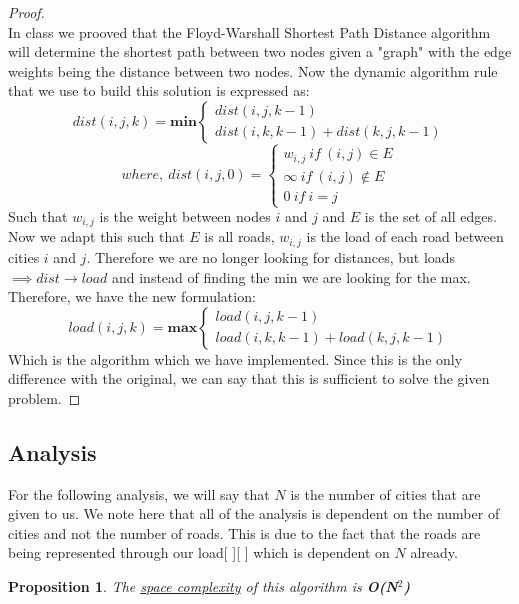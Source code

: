 \documentclass[12pt]{article}
\newtheorem{proposition}[theorem]{Proposition}
\begin{document}
\begin{proof}
~ \\ \indent In class we prooved that the Floyd-Warshall Shortest Path Distance algorithm
will determine the shortest path between two nodes given a "graph" with the edge
weights being the distance between two nodes. Now the dynamic algorithm rule that
we use to build this solution is expressed as:
\[ dist(i, j, k) = \textbf{min}
\begin{cases}
    dist(i, j, k-1) \\
    dist(i, k, k-1) + dist(k, j, k-1)
\end{cases}
\]
\[
where,\ dist(i, j, 0) =
\begin{cases}
    w_{i,j}\ if\ (i, j) \in E \\
    \infty\ if\ (i, j) \notin E \\
    0\ if\ i = j
\end{cases}
\]
Such that $w_{i,j}$ is the weight between nodes $i$ and $j$ and $E$ is the set of all edges. Now
we adapt this such that $E$ is all roads, $w_{i,j}$ is the load of each road between cities $i$
and $j$. Therefore we are no longer looking for distances, but loads $\implies dist \rightarrow load$
and instead of finding the min we are looking for the max. Therefore, we have the
new formulation:
\[ load(i, j, k) = \textbf{max}
\begin{cases}
    load(i, j, k-1) \\
    load(i, k, k-1) + load(k, j, k-1)
\end{cases}
\]
Which is the algorithm which we have implemented. Since this is the only difference with
the original, we can say that this is sufficient to solve the given problem.
\end{proof}


\subsection{Analysis}
For the following analysis, we will say that $N$ is the number of cities that are given
to us. We note here that all of the analysis is dependent on the number of cities and
not the number of roads. This is due to the fact that the roads are being represented
through our load[ ][ ] which is dependent on $N$ already.

\begin{proposition}
\label{numq}
The \underline{space complexity} of this algorithm is \textbf{O(N$^2$)}
\end{proposition}
\end{document}
